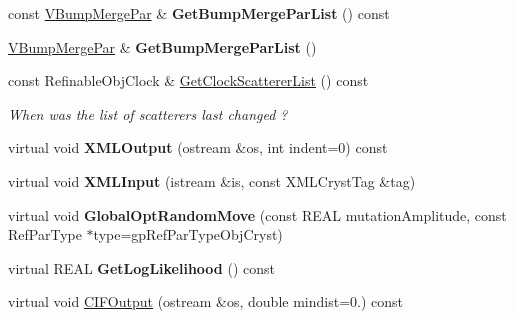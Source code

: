 \begin{DoxyCompactItemize}
\mbox{\label{class_obj_cryst_1_1_crystal_a4dcd5901022b822e7992978ba2340ee4}} 
const \mbox{\hyperlink{class_obj_cryst_1_1_crystal_af57b44b799f164dbc86227f555a5eee5}{V\+Bump\+Merge\+Par}} \& {\bfseries Get\+Bump\+Merge\+Par\+List} () const
\item 
\mbox{\label{class_obj_cryst_1_1_crystal_ae05cad39ff211e52d28ff5351b79d94e}} 
\mbox{\hyperlink{class_obj_cryst_1_1_crystal_af57b44b799f164dbc86227f555a5eee5}{V\+Bump\+Merge\+Par}} \& {\bfseries Get\+Bump\+Merge\+Par\+List} ()
\item 
\mbox{\label{class_obj_cryst_1_1_crystal_a7d162289a0de10d9c97259c1a06649f9}} 
const Refinable\+Obj\+Clock \& \mbox{\hyperlink{class_obj_cryst_1_1_crystal_a7d162289a0de10d9c97259c1a06649f9}{Get\+Clock\+Scatterer\+List}} () const
\begin{DoxyCompactList}\small\item\em When was the list of scatterers last changed ? \end{DoxyCompactList}\item 
\mbox{\label{class_obj_cryst_1_1_crystal_a1884ea2f1f758a456db7d49eee29cfa0}} 
virtual void {\bfseries X\+M\+L\+Output} (ostream \&os, int indent=0) const
\item 
\mbox{\label{class_obj_cryst_1_1_crystal_acd8a587e9470de7e7761e0896c70ef34}} 
virtual void {\bfseries X\+M\+L\+Input} (istream \&is, const X\+M\+L\+Cryst\+Tag \&tag)
\item 
\mbox{\label{class_obj_cryst_1_1_crystal_a64df0152a701f0c02f833bddd8b24d50}} 
virtual void {\bfseries Global\+Opt\+Random\+Move} (const R\+E\+AL mutation\+Amplitude, const Ref\+Par\+Type $\ast$type=gp\+Ref\+Par\+Type\+Obj\+Cryst)
\item 
\mbox{\label{class_obj_cryst_1_1_crystal_ad7b8793ebc81c1b1c897723da0feee88}} 
virtual R\+E\+AL {\bfseries Get\+Log\+Likelihood} () const
\item 
virtual void \mbox{\hyperlink{class_obj_cryst_1_1_crystal_a12969ab06ecb5293c57fb305e146cc72}{C\+I\+F\+Output}} (ostream \&os, double mindist=0.) const

\end{DoxyCompactItemize}
